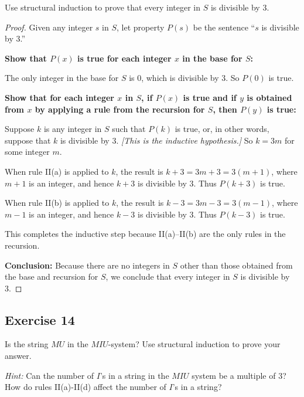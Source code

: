 \documentclass[14pt]{extarticle}
\begin{document}
Use structural induction to prove that every integer in $S$ is divisible by 3.

\begin{proof}
Given any integer $s$ in $S$, let property $P(s)$ be the sentence “$s$ is divisible by 3.” 

{\bf Show that $P(x)$ is true for each integer $x$ in the base for $S$:}

The only integer in the base for $S$ is 0, which is divisible by 3. So $P(0)$ is true. 

{\bf Show that for each integer $x$ in $S$, if $P(x)$ is true and if $y$ is obtained from $x$ by applying a rule 
from the recursion for $S$, then $P(y)$ is true:}

Suppose $k$ is any integer in $S$ such that $P(k)$ is true, or, in other words, suppose that $k$ is divisible by 3. 
{\it [This is the inductive hypothesis.]} So $k = 3m$ for some integer $m$.

When rule II(a) is applied to $k$, the result is $k+3 = 3m+3 = 3(m+1)$, where $m+1$ is an integer, and hence $k+3$ 
is divisible by 3. Thus $P(k+3)$ is true.

When rule II(b) is applied to $k$, the result is $k-3 = 3m-3 = 3(m-1)$, where $m-1$ is an integer, and hence $k-3$ 
is divisible by 3. Thus $P(k-3)$ is true.

This completes the inductive step because II(a)–II(b) are the only rules in the recursion.

{\bf Conclusion:} Because there are no integers in $S$ other than those obtained from the base and recursion for 
$S$, we conclude that every integer in $S$ is divisible by 3.
\end{proof}

\subsection{Exercise 14}
Is the string $MU$ in the $M I U$-system? Use structural induction to prove your answer.

{\it Hint:} Can the number of $I$’s in a string in the $M I U$ system be a multiple of 3? How do rules II(a)-II(d) 
affect the number of $I$’s in a string?
\end{document}
